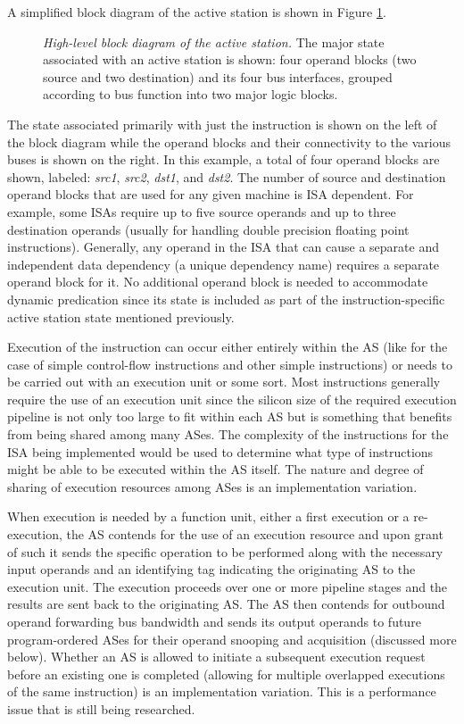 \documentclass{book}
\begin{document}
A simplified block diagram of the active station is shown in 
Figure \ref{fig:issuestation}.
%
\begin{figure}
\centerline{}
\caption[High-level block diagram of the active station.]
{{\em High-level block diagram of the active station.}
The major state associated with an active station is shown:
four operand blocks (two source and two destination)
and its four bus interfaces, grouped
according to bus function into two major logic blocks.}
\label{fig:issuestation}
\end{figure}
%
The state associated primarily with just the instruction is
shown on the left of the block diagram while the operand blocks
and their connectivity to the various buses is shown on the
right.  
In this example, a total of four operand blocks are shown, labeled:
\textit{src1}, 
\textit{src2}, 
\textit{dst1}, 
and \textit{dst2}.
The number of source and destination operand blocks that are
used for any given machine is ISA dependent.
For example, some ISAs require up to five 
source operands and up to three destination
operands (usually for handling double precision floating point 
instructions).
Generally, any operand in the ISA that can cause a separate
and independent data dependency (a unique dependency name)
requires a separate operand block for it.
No additional operand block is needed to accommodate dynamic predication
since its state is included as
part of the instruction-specific active station state mentioned previously.

Execution of the instruction can occur either entirely within the
AS (like for the case of simple control-flow instructions and
other simple instructions) or needs to be carried out with 
an execution unit or some sort.  Most instructions generally require
the use of an execution unit since the silicon size of the required
execution pipeline is not only too large to fit within each AS
but is something that benefits from being shared among many ASes.
The complexity of the instructions for the ISA being implemented 
would be used to determine what type of instructions might be
able to be executed within the AS itself.
The nature and degree of sharing of execution resources among ASes is
an implementation variation.

When execution is needed by a function unit, 
either a first execution or a re-execution,
the AS contends for the use of an execution resource and upon grant
of such it sends the specific operation to be performed along with 
the necessary input operands and an identifying tag indicating the originating
AS to the execution unit.
The execution proceeds over one or more pipeline stages
and the results are sent back to the originating AS.
The AS then contends for outbound operand forwarding bus bandwidth and 
sends its
output operands to future program-ordered ASes for their operand
snooping and acquisition (discussed more below).
Whether an AS is allowed to initiate a subsequent execution request before
an existing one is completed (allowing for multiple overlapped executions of 
the same instruction) is an implementation variation.
This is a performance issue that is still being researched.
\end{document}

